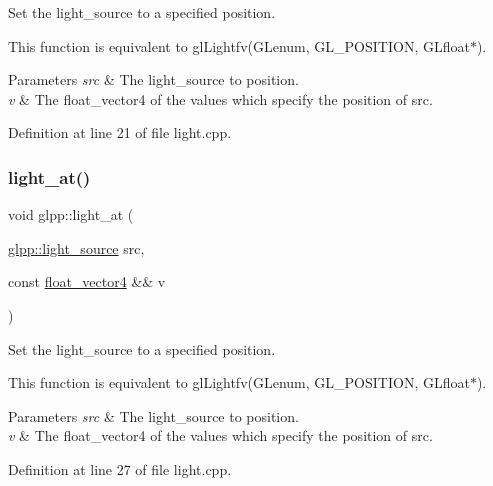 Set the light\+\_\+source to a specified position. 

This function is equivalent to gl\+Lightfv(\+G\+Lenum, G\+L\+\_\+\+P\+O\+S\+I\+T\+I\+O\+N, G\+Lfloat$\ast$).


\begin{DoxyParams}{Parameters}
{\em src} & The light\+\_\+source to position. \\
\hline
{\em v} & The float\+\_\+vector4 of the values which specify the position of {\ttfamily src}. \\
\hline
\end{DoxyParams}


Definition at line 21 of file light.\+cpp.

\mbox{\label{namespaceglpp_a326d5aae60ec28913e36ebba634f662f}} 
\subsubsection{\texorpdfstring{light\+\_\+at()}{light\_at()}\hspace{0.1cm}{\footnotesize\ttfamily [2/2]}}
{\footnotesize\ttfamily void glpp\+::light\+\_\+at (\begin{DoxyParamCaption}\item[{\hyperlink{namespaceglpp_a3b61e78dfb4271d2841ea4a660c36e2d}{glpp\+::light\+\_\+source}}]{src,  }\item[{const \hyperlink{namespaceglpp_ab4a3d7b8ed8e2e4810006eef5213a460}{float\+\_\+vector4} \&\&}]{v }\end{DoxyParamCaption})}



Set the light\+\_\+source to a specified position. 

This function is equivalent to gl\+Lightfv(\+G\+Lenum, G\+L\+\_\+\+P\+O\+S\+I\+T\+I\+O\+N, G\+Lfloat$\ast$).


\begin{DoxyParams}{Parameters}
{\em src} & The light\+\_\+source to position. \\
\hline
{\em v} & The float\+\_\+vector4 of the values which specify the position of {\ttfamily src}. \\
\hline
\end{DoxyParams}


Definition at line 27 of file light.\+cpp.

\mbox{\label{namespaceglpp_a0ed53f477ba84e11e621381832f7bf41}} 
